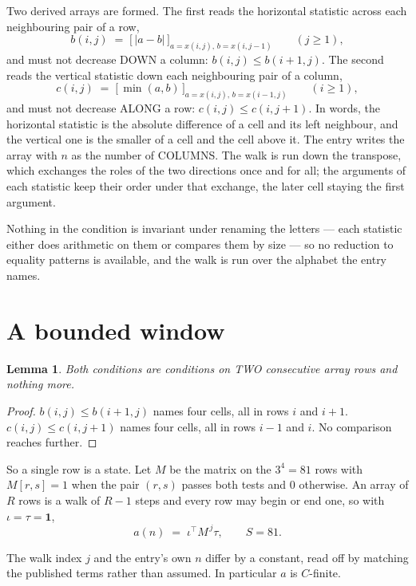 \documentclass[11pt,a4paper]{article}
\theoremstyle{plain}
\newtheorem{lemma}[theorem]{Lemma}
\theoremstyle{definition}
\begin{document}
Two derived arrays are formed. The first reads the horizontal statistic across each
neighbouring pair of a row,
\[
b(i,j)\;=\;\bigl[\,\lvert a-b\rvert\,\bigr]_{a=x(i,j),\,b=x(i,j-1)}\qquad (j\ge1),
\]
and must not decrease DOWN a column: $b(i,j)\le b(i{+}1,j)$. The second reads the vertical
statistic down each neighbouring pair of a column,
\[
c(i,j)\;=\;\bigl[\,\min(a,b)\,\bigr]_{a=x(i,j),\,b=x(i{-}1,j)}\qquad (i\ge1),
\]
and must not decrease ALONG a row: $c(i,j)\le c(i,j{+}1)$. In words, the horizontal statistic
is the absolute difference of a cell and its left neighbour, and the vertical one is
the smaller of a cell and the cell above it. The entry writes the array with $n$ as the number of COLUMNS. The walk is run down the transpose, which exchanges the roles of the two directions once and for all; the arguments of each statistic keep their order under that exchange, the later cell staying the first argument.

Nothing in the condition is invariant under renaming the letters --- each statistic either does
arithmetic on them or compares them by size --- so no reduction to equality patterns is
available, and the walk is run over the alphabet the entry names.

\section{A bounded window}

\begin{lemma}\label{lem:win}
Both conditions are conditions on TWO consecutive array rows and nothing more.
\end{lemma}

\begin{proof}
$b(i,j)\le b(i{+}1,j)$ names four cells, all in rows $i$ and $i+1$. $c(i,j)\le c(i,j{+}1)$
names four cells, all in rows $i-1$ and $i$. No comparison reaches further.
\end{proof}

So a single row is a state. Let $M$ be the matrix on the $3^{4}=81$ rows with
$M[r,s]=1$ when the pair $(r,s)$ passes both tests and $0$ otherwise. An array of $R$ rows is a
walk of $R-1$ steps and every row may begin or end one, so with $\iota=\tau=\mathbf{1}$,
\[
a(n)\;=\;\iota^{\!\top}M^{\,j}\tau ,\qquad S=81.
\]

The walk index $j$ and the entry's own $n$ differ by a constant, read off by matching the
published terms rather than assumed. In particular $a$ is $C$-finite.
\end{document}

